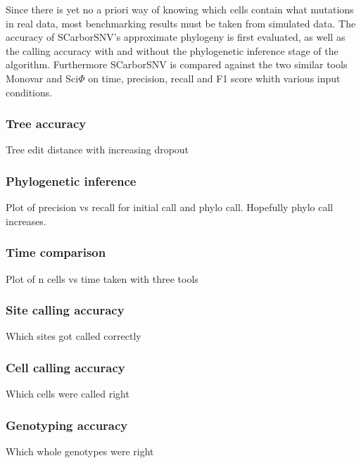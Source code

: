 \documentclass[../../main.tex]{subfiles}
\begin{document}
Since there is yet no a priori way of knowing which cells contain what mutations in real data, most benchmarking results must be taken from simulated data.
The accuracy of SCarborSNV's approximate phylogeny is first evaluated, as well as the calling accuracy with and without the phylogenetic inference stage of the algorithm.
Furthermore SCarborSNV is compared against the two similar tools Monovar and Sci$\Phi$ on time, precision, recall and F1 score whith various input conditions.

\subsubsection*{Tree accuracy}
Tree edit distance with increasing dropout

\subsubsection*{Phylogenetic inference}
Plot of precision vs recall for initial call and phylo call. Hopefully phylo call increases.

\subsubsection*{Time comparison}
Plot of n cells vs time taken with three tools

\subsubsection*{Site calling accuracy}
Which sites got called correctly

\subsubsection*{Cell calling accuracy}
Which cells were called right

\subsubsection*{Genotyping accuracy}
Which whole genotypes were right
\end{document}
